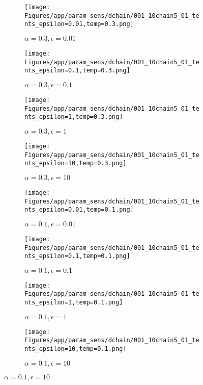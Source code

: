 \documentclass{article}
\theoremstyle{plain}
\begin{document}
\begin{appendices}
\begin{figure}
                \begin{subfigure}[b]{0.24\textwidth}
                    \centering
                    \texttt{[image: Figures/app/param\_sens/dchain/001\_10chain5\_01\_tents\_epsilon=0.01,temp=0.3.png]}
                    \caption*{$\alpha=0.3,\epsilon=0.01$}
                \end{subfigure}
                \begin{subfigure}[b]{0.24\textwidth}
                    \centering
                    \texttt{[image: Figures/app/param\_sens/dchain/001\_10chain5\_01\_tents\_epsilon=0.1,temp=0.3.png]}
                    \caption*{$\alpha=0.3,\epsilon=0.1$}
                \end{subfigure}
                \begin{subfigure}[b]{0.24\textwidth}
                    \centering
                    \texttt{[image: Figures/app/param\_sens/dchain/001\_10chain5\_01\_tents\_epsilon=1,temp=0.3.png]}
                    \caption*{$\alpha=0.3,\epsilon=1$}
                \end{subfigure}
                \begin{subfigure}[b]{0.24\textwidth}
                    \centering
                    \texttt{[image: Figures/app/param\_sens/dchain/001\_10chain5\_01\_tents\_epsilon=10,temp=0.3.png]}
                    \caption*{$\alpha=0.3,\epsilon=10$}
                \end{subfigure}
                
                \begin{subfigure}[b]{0.24\textwidth}
                    \centering
                    \texttt{[image: Figures/app/param\_sens/dchain/001\_10chain5\_01\_tents\_epsilon=0.01,temp=0.1.png]}
                    \caption*{$\alpha=0.1,\epsilon=0.01$}
                \end{subfigure}
                \begin{subfigure}[b]{0.24\textwidth}
                    \centering
                    \texttt{[image: Figures/app/param\_sens/dchain/001\_10chain5\_01\_tents\_epsilon=0.1,temp=0.1.png]}
                    \caption*{$\alpha=0.1,\epsilon=0.1$}
                \end{subfigure}
                \begin{subfigure}[b]{0.24\textwidth}
                    \centering
                    \texttt{[image: Figures/app/param\_sens/dchain/001\_10chain5\_01\_tents\_epsilon=1,temp=0.1.png]}
                    \caption*{$\alpha=0.1,\epsilon=1$}
                \end{subfigure}
                \begin{subfigure}[b]{0.24\textwidth}
                    \centering
                    \texttt{[image: Figures/app/param\_sens/dchain/001\_10chain5\_01\_tents\_epsilon=10,temp=0.1.png]}
                    \caption*{$\alpha=0.1,\epsilon=10$}
                \end{subfigure}
                

\end{figure}
\end{appendices}
\end{document}
